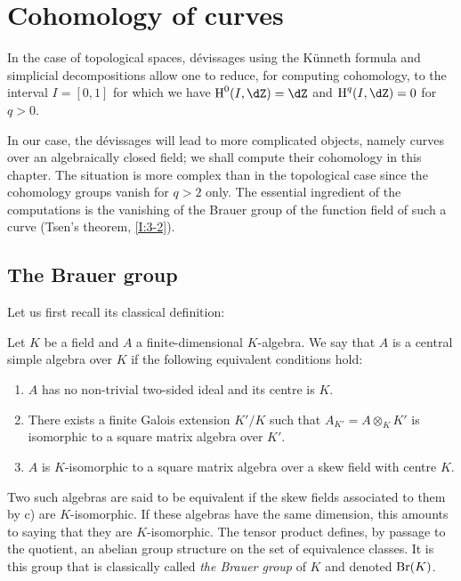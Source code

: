 \section{Cohomology of curves}\label{I:3}

In the case of topological spaces, d\'evissages using the K\"unneth formula
and simplicial decompositions allow one to reduce, for
computing cohomology, to the interval $I=[0,1]$ for which we have
$\h^0(I,\dZ)=\dZ$ and $\h^q(I,\dZ)=0$ for $q>0$.

In our case, the d\'evissages will lead to more complicated objects,
namely curves over an algebraically closed field; we shall compute
their cohomology in this chapter. The situation is more complex than in the
topological case since the cohomology groups vanish for $q>2$ only.
The essential ingredient of the computations is the vanishing of the Brauer group of the
function field of such a curve (Tsen's theorem, \ref{I:3-2}). 










\subsection{The Brauer group}\label{I:3-1}

Let us first recall its classical definition:





\begin{definition}\label{I:3-1-1}
Let $K$ be a field and $A$ a finite-dimensional $K$-algebra. We say that $A$
is a central simple algebra over $K$ if the following equivalent
conditions hold:
\begin{enumerate}[\indent a)]
  \item $A$ has no non-trivial two-sided ideal and its centre is $K$.
  \item There exists a finite Galois extension $K'/K$ such that
    $A_{K'} = A\otimes_K K'$ is isomorphic to a square matrix
    algebra over $K'$.
  \item $A$ is $K$-isomorphic to a square matrix algebra over a skew
    field with centre $K$.
\end{enumerate}
\end{definition}

Two such algebras are said to be equivalent if the skew fields
associated to them by c) are $K$-isomorphic. If these algebras have the
same dimension, this amounts to saying that they are $K$-isomorphic. The
tensor product defines, by passage to the quotient, an abelian group
structure on the set of equivalence classes. It is this group that is
classically called \emph{the Brauer group} of $K$ and denoted
$\operatorname{Br}(K)$. 





